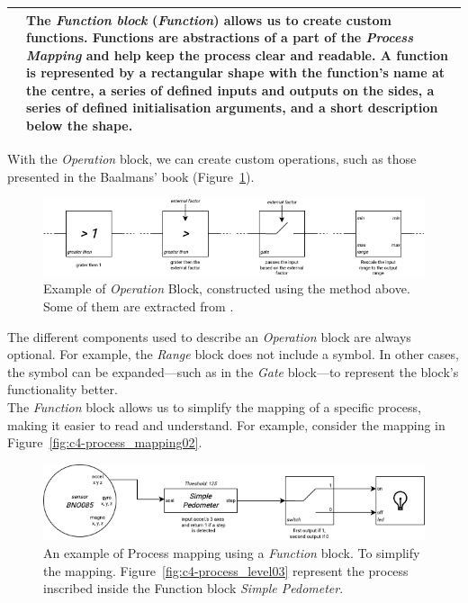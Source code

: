 \begin{longtable}{|m{}|m{}|}
    & 
    The \textit{Function block} (\textit{Function}) allows us to create custom functions. Functions are abstractions of a part of the \textit{Process Mapping} and help keep the process clear and readable. A function is represented by a rectangular shape with the function's name at the centre, a series of defined inputs and outputs on the sides, a series of defined initialisation arguments, and a short description below the shape.
    \\\hline
\end{longtable}
With the \textit{Operation} block, we can create custom operations, such as those presented in the Baalmans’ book \cite{baalman2022composing} (Figure~\ref{fig:c4-process_level}).
\begin{figure}[!h]
    \centering
    \includegraphics[width=1\linewidth]{chapters/4-MDC_model_application/image/bvl-process_level.png}
    \caption{Example of \textit{Operation} Block, constructed using the method above. Some of them are extracted from \cite{baalman2022composing}.}
    \label{fig:c4-process_level}
\end{figure}
The different components used to describe an \textit{Operation} block are always optional. For example, the \textit{Range} block does not include a symbol. In other cases, the symbol can be expanded—such as in the \textit{Gate} block—to represent the block's functionality better.\\
The \textit{Function} block allows us to simplify the mapping of a specific process, making it easier to read and understand. For example, consider the mapping in Figure~\ref{fig:c4-process_mapping02}.
\begin{figure}[!h]
    \centering
    \includegraphics[width=0.7\linewidth]{chapters/4-MDC_model_application/image/bvl-process_level02.png}
    \caption{An example of Process mapping using a \textit{Function} block. To simplify the mapping. Figure~\ref{fig:c4-process_level03} represent the process inscribed inside the Function block \textit{Simple Pedometer}.}
    \label{fig:c4-process_level02}
\end{figure}
